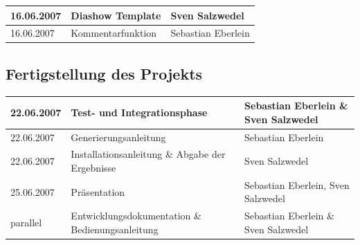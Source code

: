 \documentclass[a4paper,12pt,liststotocnumbered]{scrartcl}
\begin{document}
\begin{tabularx}{\textwidth}{|l|X|X|}

	\hline

	16.06.2007&Diashow Template&Sven Salzwedel\\

	\hline

	16.06.2007&Kommentarfunktion&Sebastian Eberlein\\
	
	\hline
	
\end{tabularx}

\subsection{Fertigstellung des Projekts}

\begin{tabularx}{\textwidth}{|l|X|X|}

	\hline

	22.06.2007&Test- und Integrationsphase&Sebastian Eberlein \& Sven
	Salzwedel\\

	\hline

	22.06.2007&Generierungsanleitung&Sebastian Eberlein\\

	\hline

	22.06.2007&Installationsanleitung \& Abgabe der Ergebnisse&Sven
	Salzwedel\\

	\hline

	25.06.2007&Präsentation&Sebastian Eberlein, Sven Salzwedel\\

	\hline

	parallel&Entwicklungsdokumentation \& Bedienungsanleitung&Sebastian
	Eberlein \& Sven Salzwedel\\

	\hline

\end{tabularx}
\end{document}
